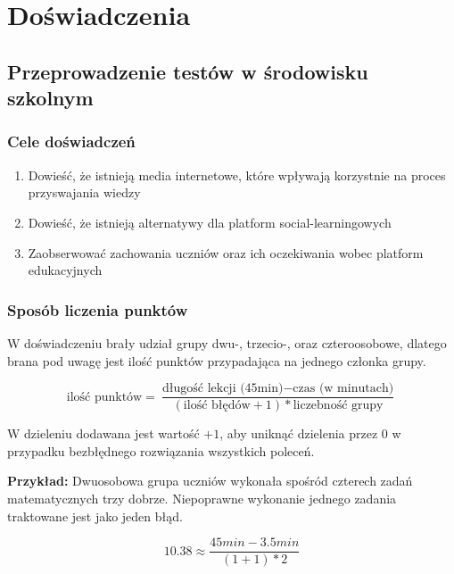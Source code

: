 \documentclass[10pt]{beamer}
\begin{document}
\section{Doświadczenia}
\subsection{Przeprowadzenie testów w środowisku szkolnym}

\begin{frame}
\frametitle{Cele doświadczeń}
\begin{enumerate}
  \item Dowieść, że istnieją media internetowe, które wpływają korzystnie na proces przyswajania wiedzy
  \item Dowieść, że istnieją alternatywy dla platform social-learningowych
  \item Zaobserwować zachowania uczniów oraz ich oczekiwania wobec platform edukacyjnych
\end{enumerate}
\end{frame}

\begin{frame}
\frametitle{Sposób liczenia punktów}
\small
W doświadczeniu brały udział grupy dwu-, trzecio-, oraz czteroosobowe, dlatego brana pod uwagę jest ilość punktów przypadająca na jednego członka grupy.

$$\text{ilość punktów} = \frac{\text{długość lekcji (45min)} - \text{czas (w minutach)}}{ (\text{ilość błędów}+1) * \text{liczebność grupy}}$$

W dzieleniu dodawana jest wartość $+1$, aby uniknąć dzielenia przez $0$ w przypadku bezbłędnego rozwiązania wszystkich poleceń.

\textbf{Przykład:} Dwuosobowa grupa uczniów wykonała spośród czterech zadań matematycznych trzy dobrze. Niepoprawne wykonanie jednego zadania traktowane jest jako jeden błąd.

$$10.38 \approx \frac{45min - 3.5min}{ (1+1) * \text{2}}$$
\end{frame}
\end{document}
